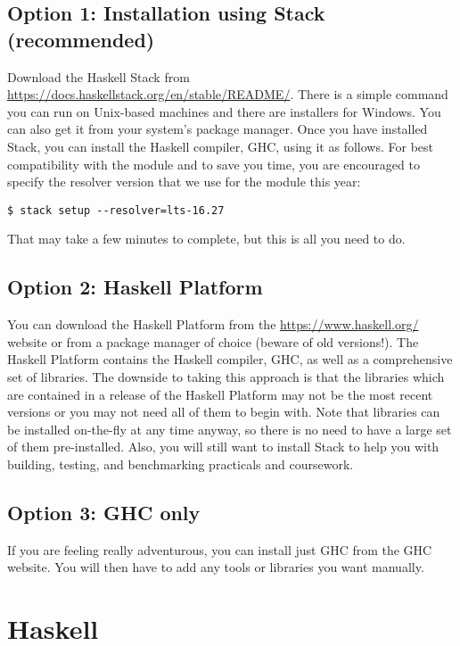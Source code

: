 \subsection{Option 1: Installation using Stack (recommended)}

Download the Haskell Stack from {\small \url{https://docs.haskellstack.org/en/stable/README/}}. There is a simple command you can run on Unix-based machines and there are installers for Windows. You can also get it from your system's package manager. Once you have installed Stack, you can install the Haskell compiler, GHC, using it as follows. For best compatibility with the module and to save you time, you are encouraged to specify the resolver version that we use for the module this year:
\begin{verbatim}
$ stack setup --resolver=lts-16.27
\end{verbatim}
That may take a few minutes to complete, but this is all you need to do.

\subsection{Option 2: Haskell Platform}

You can download the Haskell Platform from the {\small \url{https://www.haskell.org/}} website or from a package manager of choice (beware of old versions!). The Haskell Platform contains the Haskell compiler, GHC, as well as a comprehensive set of libraries. The downside to taking this approach is that the libraries which are contained in a release of the Haskell Platform may not be the most recent versions or you may not need all of them to begin with. Note that libraries can be installed on-the-fly at any time anyway, so there is no need to have a large set of them pre-installed. Also, you will still want to install Stack to help you with building, testing, and benchmarking practicals and coursework.

\subsection{Option 3: GHC only}

If you are feeling really adventurous, you can install just GHC from the GHC website. You will then have to add any tools or libraries you want manually.

\section{Haskell}

